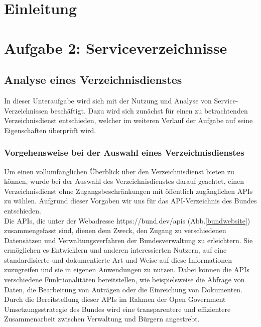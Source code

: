 \documentclass[notitlepage, hidelinks]{article}
\begin{document}
\thispagestyle{empty}
\clearpage
\newpage
\tableofcontents
\thispagestyle{empty}
\clearpage

\normalsize
{}


\section{Einleitung}

\section{Aufgabe 2: Serviceverzeichnisse}
\subsection{Analyse eines Verzeichnisdienstes}

In dieser Unteraufgabe wird sich mit der Nutzung und Analyse von Service-Verzeichnissen beschäftigt. Dazu wird sich zunächst für einen zu betrachtenden Verzeichnisdienst entschieden, welcher im weiteren Verlauf der Aufgabe auf seine Eigenschaften überprüft wird.

\subsubsection{Vorgehensweise bei der Auswahl eines Verzeichnisdienstes}
Um einen vollumfänglichen Überblick über den Verzeichnisdienst bieten zu können, wurde bei der Auswahl des Verzeichnisdienstes darauf geachtet, einen Verzeichnisdienst ohne Zugangsbeschränkungen mit öffentlich zugänglichen APIs zu wählen. Aufgrund dieser Vorgaben wir uns für das API-Verzeichnis des Bundes entschieden. \\
Die APIs, die unter der Webadresse https://bund.dev/apis (Abb.\ref{bundwebsite}) zusammengefasst sind, dienen dem Zweck, den Zugang zu verschiedenen Datensätzen und Verwaltungsverfahren der Bundesverwaltung zu erleichtern. Sie ermöglichen es Entwicklern und anderen interessierten Nutzern, auf eine standardisierte und dokumentierte Art und Weise auf diese Informationen zuzugreifen und sie in eigenen Anwendungen zu nutzen. Dabei können die APIs verschiedene Funktionalitäten bereitstellen, wie beispielsweise die Abfrage von Daten, die Bearbeitung von Anträgen oder die Einreichung von Dokumenten. Durch die Bereitstellung dieser APIs im Rahmen der Open Government Umsetzungsstrategie des Bundes wird eine transparentere und effizientere Zusammenarbeit zwischen Verwaltung und Bürgern angestrebt. 
\end{document}
